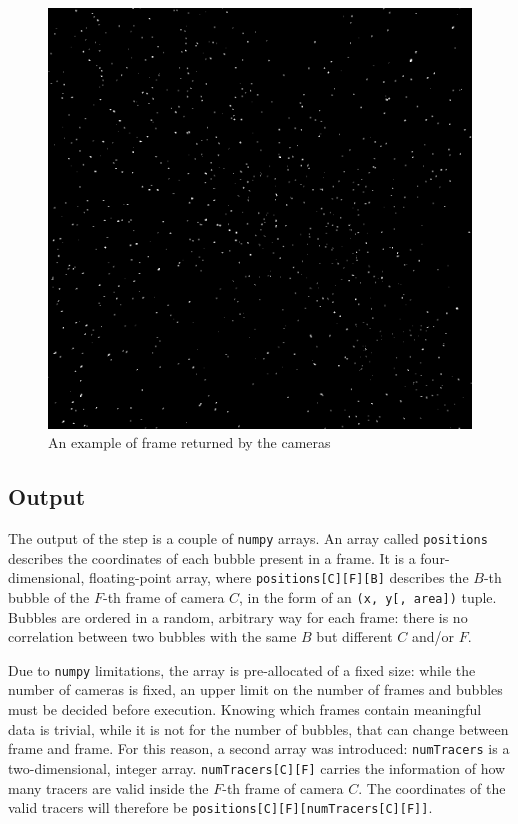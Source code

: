 \begin{figure}
	\centerline{\includegraphics[width=\locateimgsize]{images/locate/_original-frame-full.png}}
	\caption{\centering An example of frame returned by the cameras}
	\label{fig:locate:original}
\end{figure}

\subsection{Output}
\label{sec:locate:output}

The output of the \locate* step is a couple of \texttt{numpy} arrays.
An array called \texttt{positions} describes the coordinates of each bubble present in a frame.
It is a four-dimensional, floating-point array, where \texttt{positions[C][F][B]} describes the $B$-th bubble of the $F$-th frame of camera $C$, in the form of an \texttt{(x, y[, area])} tuple.
Bubbles are ordered in a random, arbitrary way for each frame: there is no correlation between two bubbles with the same $B$ but different $C$ and/or $F$.

Due to \texttt{numpy} limitations, the array is pre-allocated of a fixed size: while the number of cameras is fixed, an upper limit on the number of frames and bubbles must be decided before execution.
Knowing which frames contain meaningful data is trivial, while it is not for the number of bubbles, that can change between frame and frame.
For this reason, a second array was introduced: \texttt{numTracers} is a two-dimensional, integer array.
\texttt{numTracers[C][F]} carries the information of how many tracers are valid inside the $F$-th frame of camera $C$.
The coordinates of the valid tracers will therefore be \texttt{positions[C][F][numTracers[C][F]]}.

